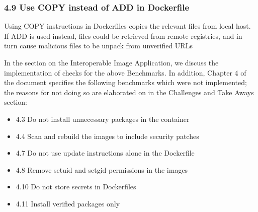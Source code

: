 \subsubsection*{4.9 Use COPY instead of ADD in Dockerfile} Using COPY instructions in Dockerfiles copies the relevant files from local host. If ADD is used instead, files could be retrieved from remote registries, and in turn cause malicious files to be unpack from unverified URLs \cite[pp 120-1]{center_for_internet_security}

In the section on the Interoperable Image Application, we discuss the implementation of checks for the above Benchmarks. In addition, Chapter 4 of the document specifies the following benchmarks which were not implemented; the reasons for not doing so are elaborated on in the Challenges and Take Aways section:

\begin{itemize}
    \item 4.3 Do not install unnecessary packages in the container
    \item 4.4 Scan and rebuild the images to include security patches
    \item 4.7 Do not use update instructions alone in the Dockerfile
    \item 4.8 Remove setuid and setgid permissions in the images
    \item 4.10 Do not store secrets in Dockerfiles
    \item 4.11 Install verified packages only
\end{itemize}